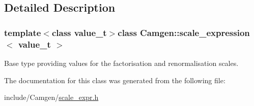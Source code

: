 \subsection{Detailed Description}
\subsubsection*{template$<$class value\-\_\-t$>$class Camgen\-::scale\-\_\-expression$<$ value\-\_\-t $>$}

Base type providing values for the factorisation and renormalisation scales. 



The documentation for this class was generated from the following file\-:\begin{DoxyCompactItemize}
\item 
include/\-Camgen/\hyperlink{a00741}{scale\-\_\-expr.\-h}\end{DoxyCompactItemize}
